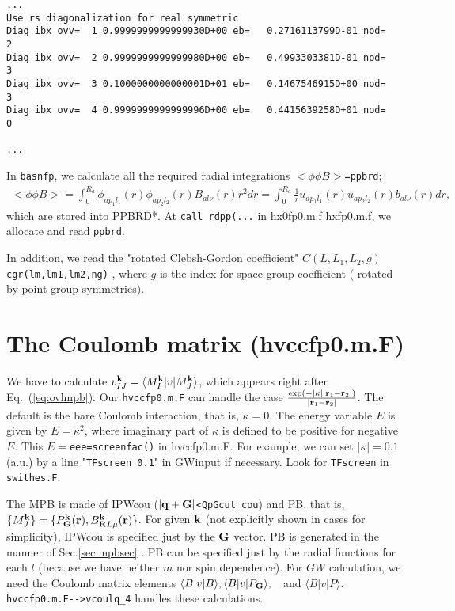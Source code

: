 \documentclass[a4paper,10pt,epsf,fleqn]{article}
\newcommand{\bfq}{{\bf q}}
\newcommand{\bfk}{{\bf k}}
\newcommand{\bfr}{{\bf r}}
\newcommand{\bfG}{{\bf G}}
\newcommand{\bfR}{{\bf R}}
\newcommand{\io}[1]{{\sf  #1}}
\newcommand{\req}[1]{\mbox{Eq.~(\ref{#1})}}
\begin{document}
{\baselineskip=4mm
\begin{verbatim}
...
Use rs diagonalization for real symmetric 
Diag ibx ovv=  1 0.9999999999999930D+00 eb=   0.2716113799D-01 nod=   2
Diag ibx ovv=  2 0.9999999999999980D+00 eb=   0.4993303381D-01 nod=   3
Diag ibx ovv=  3 0.1000000000000001D+01 eb=   0.1467546915D+00 nod=   3
Diag ibx ovv=  4 0.9999999999999996D+00 eb=   0.4415639258D+01 nod=   0

...
\end{verbatim}
}

In \verb|basnfp|, we calculate all the required 
radial integrations $<\phi \phi B>$\verb!=ppbrd!;
\begin{eqnarray}
   <\phi \phi B> = \int_0^{R_a}
   \phi_{ap_1 l_1}(r) \phi_{ap_2 l_2}(r) B_{al\nu}(r) r^2 dr
   = \int_0^{R_a} \frac{1}{r}
     u_{ap_1l_1}(r) u_{ap_2l_2}(r) b_{al\nu}(r) dr,
\end{eqnarray}
which are stored into \io{PPBRD*}.  
At \verb!call rdpp(...! in {\sf hx0fp0.m.f hxfp0.m.f},
we allocate and read \verb!ppbrd!. 

In addition, we read the "rotated Clebsh-Gordon coefficient"
$C(L,L_1,L_2,g)$ \verb!cgr(lm,lm1,lm2,ng)! 
, where $g$ is the index for space group
coefficient ( rotated by point group symmetries).




\section{The Coulomb matrix (hvccfp0.m.F)}
We have to calculate
$v_{IJ}^\bfk= \langle M^{\bf k}_{I} |v|  M^{\bf k}_J \rangle$, which
appears right after \req{eq:ovlmpb}.
Our \verb#hvccfp0.m.F# can handle the
case $\frac{\exp(- |\kappa| |\bfr_1-\bfr_2|)}{|\bfr_1-\bfr_2|}$.
The default is the bare Coulomb interaction, that is, $\kappa=0$. 
The energy variable $E$ is given by $E=\kappa^2$, where
imaginary part of $\kappa$ is defined to be positive for negative $E$.
This $E=$\verb#eee=screenfac()# in hvccfp0.m.F. 
For example, we can set $|\kappa|=0.1$ (a.u.) by a line
"{\tt TFscreen 0.1}" in \io{GWinput} if necessary. Look for {\tt TFscreen} in \verb#swithes.F#.

The MPB is made of IPWcou ($|\bfq+\bfG|$\verb#<QpGcut_cou#) and PB,
that is, $\{M^{\bf k}_J\}=\{P_\bfG^\bfk(\bfr), B^\bfk_{\bfR{L}\mu}(\bfr)\}$.
For given $\bfk$ (not explicitly shown in cases for simplicity), 
IPWcou is specified just by the $\bfG$ vector.
PB is generated in the manner of Sec.\ref{sec:mpbsec} . 
PB can be specified just by the radial functions for each $l$ 
(because we have neither $m$ nor spin dependence).
For $GW$ calculation, we need the Coulomb matrix elements
$\langle B|v|B \rangle,\langle B|v|P_\bfG \rangle,$　and $\langle B|v|P \rangle$. \verb#hvccfp0.m.F-->vcoulq_4# handles these calculations.
\end{document}
